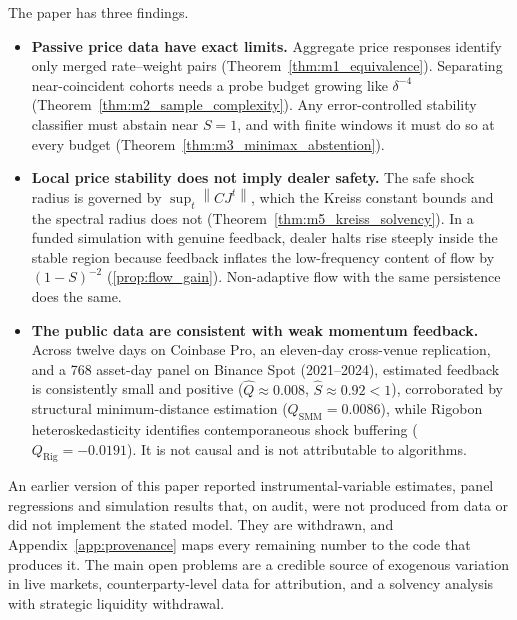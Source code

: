 \documentclass[10pt,twocolumn,letterpaper]{article}
\theoremstyle{definition}
\theoremstyle{remark}
\newcommand{\norm}[1]{\left\lVert #1\right\rVert}
\begin{document}
The paper has three findings.
\begin{itemize}
 \item \textbf{Passive price data have exact limits.} Aggregate price responses identify only merged rate--weight pairs (Theorem~\ref{thm:m1_equivalence}). Separating near-coincident cohorts needs a probe budget growing like $\delta^{-4}$ (Theorem~\ref{thm:m2_sample_complexity}). Any error-controlled stability classifier must abstain near $S=1$, and with finite windows it must do so at every budget (Theorem~\ref{thm:m3_minimax_abstention}).
 \item \textbf{Local price stability does not imply dealer safety.} The safe shock radius is governed by $\sup_t\norm{CJ^t}$, which the Kreiss constant bounds and the spectral radius does not (Theorem~\ref{thm:m5_kreiss_solvency}). In a funded simulation with genuine feedback, dealer halts rise steeply inside the stable region because feedback inflates the low-frequency content of flow by $(1-S)^{-2}$ (\cref{prop:flow_gain}). Non-adaptive flow with the same persistence does the same.
 \item \textbf{The public data are consistent with weak momentum feedback.} Across twelve days on Coinbase Pro, an eleven-day cross-venue replication, and a 768 asset-day panel on Binance Spot (2021--2024), estimated feedback is consistently small and positive ($\hat Q \approx 0.008$, $\hat S \approx 0.92 < 1$), corroborated by structural minimum-distance estimation ($Q_{\text{SMM}} = 0.0086$), while Rigobon heteroskedasticity identifies contemporaneous shock buffering ($Q_{\text{Rig}} = -0.0191$). It is not causal and is not attributable to algorithms.
\end{itemize}

An earlier version of this paper reported instrumental-variable estimates, panel regressions and simulation results that, on audit, were not produced from data or did not implement the stated model. They are withdrawn, and Appendix~\ref{app:provenance} maps every remaining number to the code that produces it. The main open problems are a credible source of exogenous variation in live markets, counterparty-level data for attribution, and a solvency analysis with strategic liquidity withdrawal.
\end{document}
